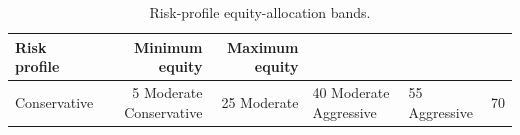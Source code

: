 \begin{table}[htbp]
\centering
\footnotesize
\caption{Risk-profile equity-allocation bands.}
\label{tab:gbi-risk-bands}
\begin{tabular}{lrr}
\toprule
Risk profile & Minimum equity & Maximum equity \\
\midrule
Conservative & 5%
Moderate Conservative & 25%
Moderate & 40%
Moderate Aggressive & 55%
Aggressive & 70%
\bottomrule
\end{tabular}
\end{table}
